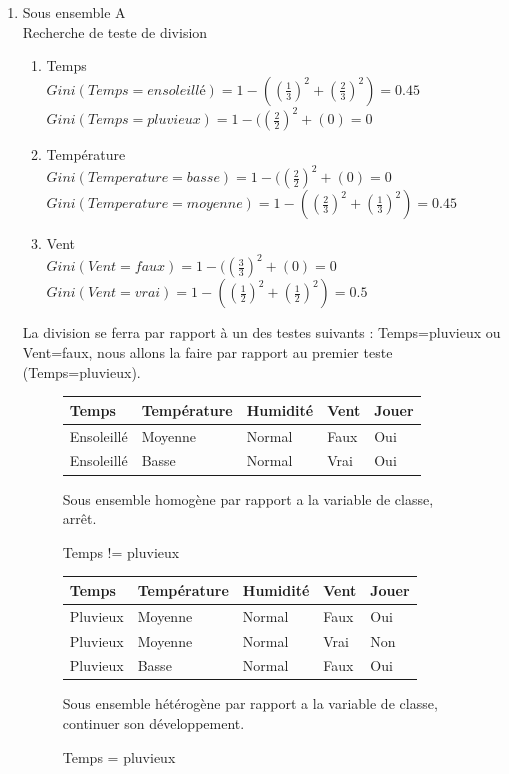 \documentclass[a4paper, 11pt]{report}
\begin{document}
\begin{enumerate}
\item Sous ensemble A\\
Recherche de teste de division



\begin{enumerate}
\item Temps\\
$Gini(Temps = ensoleillé) = 1 - ((\frac{1}{3})^2 + (\frac{2}{3})^2)=0.45 $\\
$Gini(Temps = pluvieux) = 1 - ((\frac{2}{2})^2 + ( 0 )=0 $\\
\item Température\\
$Gini(Temperature = basse) = 1 - ((\frac{2}{2})^2 + ( 0 )=0 $\\
$Gini(Temperature = moyenne) = 1 - ((\frac{2}{3})^2 + (\frac{1}{3})^2)=0.45 $\\

\item Vent\\
$Gini(Vent = faux) = 1 - ((\frac{3}{3})^2 + ( 0 )=0 $\\
$Gini(Vent = vrai) = 1 - ((\frac{1}{2})^2 + (\frac{1}{2})^2)=0.5 $
\end{enumerate}
La division se ferra par rapport à un des testes suivants : Temps=pluvieux ou Vent=faux, nous allons la faire par rapport au premier teste (Temps=pluvieux).


\begin{figure}[!h]
\caption{Temps != pluvieux}
\label{ens8}
\begin{center}
\begin{tabular}{| l | l | l | l | l |}
\hline
\rowcolor{gray!25}
Temps & Température & Humidité & Vent & Jouer \\
\hline
Ensoleillé & Moyenne & Normal & Faux &  \cellcolor{yellow}Oui \\
\hline
Ensoleillé & Basse & Normal & Vrai &  \cellcolor{yellow}Oui \\
\hline
\end{tabular}
\end{center}
Sous ensemble homogène par rapport a la variable de classe, arrêt.
\end{figure}

\begin{figure}[!h]
\caption{Temps = pluvieux}
\label{ens7}
\begin{center}
\begin{tabular}{| l | l | l | l | l |}
\hline
\rowcolor{gray!25}
Temps & Température & Humidité & Vent & Jouer \\
\hline
Pluvieux & Moyenne & Normal & Faux & \cellcolor{yellow}Oui \\
\hline
Pluvieux & Moyenne & Normal & Vrai &  \cellcolor{green}Non \\
\hline
Pluvieux & Basse & Normal & Faux &  \cellcolor{yellow}Oui \\
\hline
\end{tabular}
\end{center}
Sous ensemble hétérogène par rapport a la variable de classe, continuer son développement.
\end{figure}


\end{enumerate}
\end{document}
